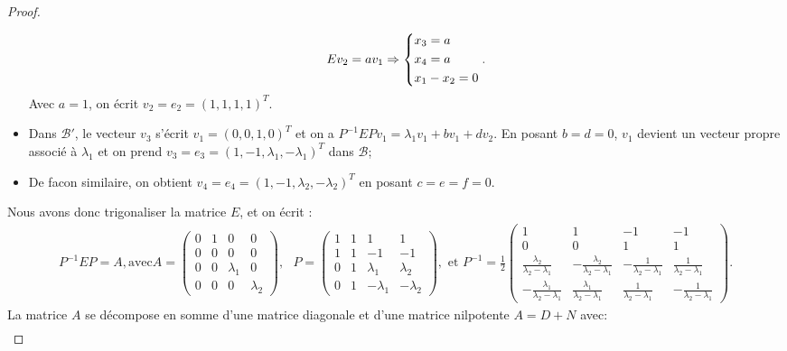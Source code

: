 \begin{proof}
\begin{itemize}
    \begin{align*}
        E v_2 = a v_1 \Rightarrow
        \begin{dcases}            
        x_3 = a  \\
        x_4 = a  \\
        x_1 - x_2 = 0
        \end{dcases}.
    \end{align*} 
    Avec $a = 1$, on écrit $v_2 = e_2 = (1,1,1,1)^T$.
    \item Dans $\mathcal{B}'$, le vecteur $v_3$ s'écrit $v_1 = (0,0,1,0)^T$ et on a $P^{-1}EP v_1 = \lambda_1 v_1 + bv_1 + d v_2$. En posant $b=d=0$, $v_1$ devient un vecteur propre associé à $\lambda_1$ et on prend $v_3 = e_3 = (1,-1,\lambda_1,-\lambda_1)^T$ dans $\mathcal{B}$;
    \item De facon similaire, on obtient $v_4 = e_4 = (1,-1,\lambda_2,-\lambda_2)^T$ en posant $c=e=f=0$.
\end{itemize}
Nous avons donc trigonaliser la matrice $E$, et on écrit :
\begin{align*}
    P^{-1}EP = A, \text{avec} A = \begin{pmatrix}
        0 & 1 & 0 & 0 \\ 0 & 0 & 0 & 0 \\ 0 & 0 & \lambda_1 & 0 \\ 0 & 0 & 0 & \lambda_2
    \end{pmatrix}, \text{  } P = \begin{pmatrix}
        1 & 1 & 1 & 1 \\ 1 & 1 & -1 & -1 \\ 0 & 1 & \lambda_1 & \lambda_2 \\ 0 & 1 & -\lambda_1 & -\lambda_2
    \end{pmatrix}, \text{ et } P^{-1} = \frac{1}{2}\begin{pmatrix}
        1 & 1 & -1 & -1 \\ 0 & 0 & 1 & 1 \\ \frac{\lambda_2}{\lambda_2-\lambda_1} & -\frac{\lambda_2}{\lambda_2-\lambda_1} & -\frac{1}{\lambda_2-\lambda_1} & \frac{1}{\lambda_2-\lambda_1} \\ -\frac{\lambda_1}{\lambda_2-\lambda_1} & \frac{\lambda_1}{\lambda_2-\lambda_1} & \frac{1}{\lambda_2-\lambda_1} & -\frac{1}{\lambda_2-\lambda_1}
    \end{pmatrix}.
\end{align*}
La matrice $A$ se décompose en somme d'une matrice diagonale et d'une matrice nilpotente $A = D+N$ avec:
\begin{align*}

\end{align*}
\end{proof}

